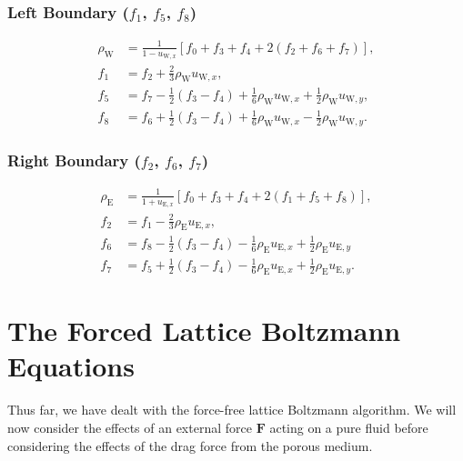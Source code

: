 \documentclass[a4paper, 11pt]{report}
\begin{document}
\subsubsection*{Left Boundary ($f_1$, $f_5$, $f_8$)}
\vspace{-5mm}
\begin{subequations} \label{eq:3.54}
\begin{align}
    \rho_\mathrm{W} &= \frac{1}{1-u_{\mathrm{W},x}} \left[ f_0 + f_3 + f_4 + 2(f_2 + f_6 + f_7)\right], \label{eq:3.54a}\\
    f_1 &= f_2 + \frac{2}{3}\rho_\mathrm{W}u_{\mathrm{W},x}, \label{eq:3.54b}\\
    f_5 &= f_7 - \frac{1}{2}(f_3-f_4) + \frac{1}{6}\rho_\mathrm{W}u_{\mathrm{W},x} + \frac{1}{2}\rho_\mathrm{W}u_{\mathrm{W},y}, \label{eq:3.54c}\\
    f_8 &= f_6 + \frac{1}{2}(f_3-f_4) + \frac{1}{6}\rho_\mathrm{W}u_{\mathrm{W},x} - \frac{1}{2}\rho_\mathrm{W}u_{\mathrm{W},y}. \label{eq:3.54d}
\end{align}
\end{subequations}

\subsubsection*{Right Boundary ($f_2$, $f_6$, $f_7$)}
\vspace{-5mm}
\begin{subequations} \label{eq:3.55}
\begin{align}
    \rho_\mathrm{E} &= \frac{1}{1+u_{\mathrm{E},x}} \left[ f_0 + f_3 + f_4 + 2(f_1 + f_5 + f_8)\right], \label{eq:3.55a}\\
    f_2 &= f_1 - \frac{2}{3}\rho_\mathrm{E}u_{\mathrm{E},x}, \label{eq:3.55b} \\
    f_6 &= f_8 - \frac{1}{2}(f_3-f_4) - \frac{1}{6}\rho_\mathrm{E}u_{\mathrm{E},x} + \frac{1}{2}\rho_\mathrm{E}u_{\mathrm{E},y} \label{eq:3.55c} \\
    f_7 &= f_5 + \frac{1}{2}(f_3-f_4) - \frac{1}{6}\rho_\mathrm{E}u_{\mathrm{E},x} + \frac{1}{2}\rho_\mathrm{E}u_{\mathrm{E},y}. \label{eq:3.55d}
\end{align}
\end{subequations}
\newpage
\section{The Forced Lattice Boltzmann Equations} \label{sec:3.4}
Thus far, we have dealt with the force-free lattice Boltzmann algorithm. We will now consider the effects of an external force $\mathbf{F}$ acting on a pure fluid before considering the effects of the drag force from the porous medium. 
\end{document}
